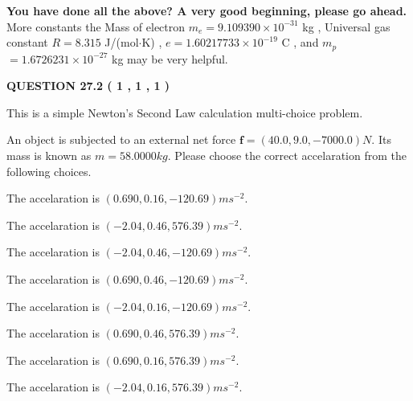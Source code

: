 \documentclass[12pt]{article}
\begin{document}
   
   
   
\vspace{0.3in}
{\textbf{\LARGE{You have done all the above? A very good beginning, please go ahead.}}}
More constants the
Mass of electron
$m_e$$ =
9.109390 \times 10^{-31} $
kg
,
Universal gas constant
$R$$ =
8.315 $
J/(mol$\cdot $K)
,
$e$$ =
1.60217733 \times 10^{-19} $
C
, and
$m_p$$ =
1.6726231 \times 10^{-27} $
kg
%
may be very helpful.
\vspace{0.3in}
   
   
  
\vspace{0.2in}
  
{\textbf{\Large{QUESTION
27.2 
 (           1 ,           1 ,           1 )
}}}
  
  


\noindent{}
This is a simple Newton's Second Law calculation multi-choice problem.  
\noindent{}


 
 
An object is subjected to an external net force $\mathbf{f}=
(40.0 , 9.0 , -7000.0) N$.
Its mass is known as $m= %
58.0000 kg$. Please choose the
correct accelaration from the following choices.
 
 
 
The accelaration is $  %
(
0.690,
0.16,
-120.69)
ms^{-2} $.
 
 
The accelaration is $  %
(
-2.04,
0.46,
576.39)
ms^{-2} $.
 
 
The accelaration is $  %
(
-2.04,
0.46,
-120.69)
ms^{-2} $.
 
 
The accelaration is $  %
(
0.690,
0.46,
-120.69)
ms^{-2} $.
 
 
The accelaration is $  %
(
-2.04,
0.16,
-120.69)
ms^{-2} $.
 
 
The accelaration is $  %
(
0.690,
0.46,
576.39)
ms^{-2} $.
 
 
The accelaration is $  %
(
0.690,
0.16,
576.39)
ms^{-2} $.
 
 
The accelaration is $  %
(
-2.04,
0.16,
576.39)
ms^{-2} $.
 
 
\noindent{}
 
\end{document}
